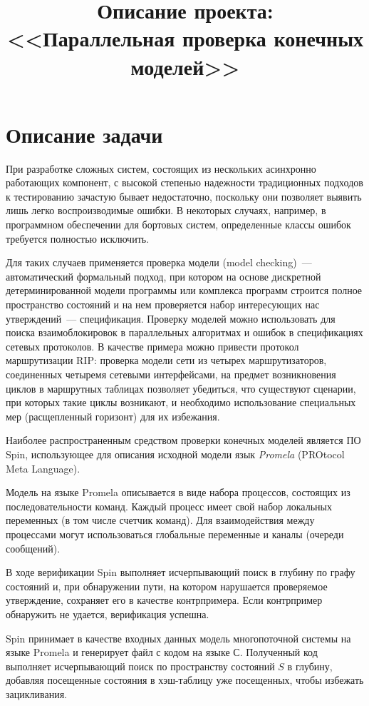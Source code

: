 \documentclass[12pt,a4paper,fleqn]{article}
\title{Описание проекта: \\ <<Параллельная проверка конечных моделей>>}
\author{} \date{}
\begin{document}
\maketitle

\section{Описание задачи}

При разработке сложных систем, состоящих из нескольких асинхронно работающих компонент, с
высокой степенью надежности традиционных подходов к тестированию зачастую бывает
недостаточно, поскольку они позволяет выявить лишь легко воспроизводимые ошибки. В
некоторых случаях, например, в программном обеспечении для бортовых систем, определенные
классы ошибок требуется полностью исключить.

Для таких случаев применяется проверка модели (model checking)~--- автоматический
формальный подход, при котором на основе дискретной детерминированной модели программы или
комплекса программ строится полное пространство состояний и на нем проверяется набор
интересующих нас утверждений~--- спецификация. Проверку моделей можно использовать для
поиска взаимоблокировок в параллельных алгоритмах и ошибок в спецификациях сетевых
протоколов. В качестве примера можно привести протокол маршрутизации RIP: проверка модели
сети из четырех маршрутизаторов, соединенных четыремя сетевыми интерфейсами, на предмет
возникновения циклов в маршрутных таблицах позволяет убедиться, что существуют сценарии,
при которых такие циклы возникают, и необходимо использование специальных мер
(расщепленный горизонт) для их избежания.

Наиболее распространенным средством проверки конечных моделей является ПО Spin,
использующее для описания исходной модели язык \emph{Promela} (PROtocol Meta Language).

Модель на языке Promela описывается в виде набора процессов, состоящих из
последовательности команд. Каждый процесс имеет свой набор локальных переменных (в том
числе счетчик команд). Для взаимодействия между процессами могут использоваться глобальные
переменные и каналы (очереди сообщений).

В ходе верификации Spin выполняет исчерпывающий поиск в глубину по графу состояний и, при
обнаружении пути, на котором нарушается проверяемое утверждение, сохраняет его в качестве
контрпримера. Если контрпример обнаружить не удается, верификация успешна.

Spin принимает в качестве входных данных модель многопоточной системы на языке Promela и
генерирует файл с кодом на языке С. Полученный код выполняет исчерпывающий поиск по
пространству состояний $S$ в глубину, добавляя посещенные состояния в хэш-таблицу уже
посещенных, чтобы избежать зацикливания.
\end{document}
